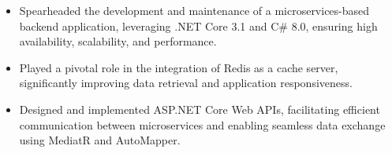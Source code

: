 \documentclass[1pt,a4paper,verdana]{moderncv} %
\begin{document}
{\begin{itemize}
		\item Spearheaded the development and maintenance of a microservices-based backend application, leveraging .NET Core 3.1 and C\# 8.0, ensuring high availability, scalability, and performance.
		\item Played a pivotal role in the integration of Redis as a cache server, significantly improving data retrieval and application responsiveness.
		\item Designed and implemented ASP.NET Core Web APIs, facilitating efficient communication between microservices and enabling seamless data exchange using MediatR and AutoMapper.
\end{itemize}}
\end{document}
